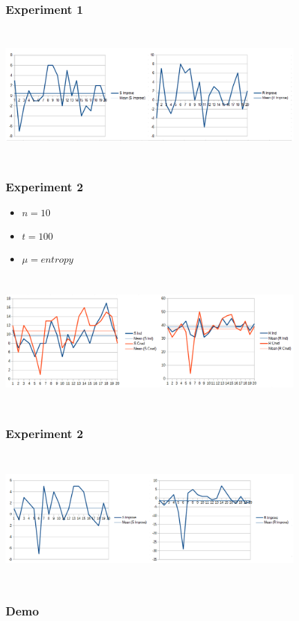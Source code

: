 \documentclass{beamer}
\begin{document}
	\begin{frame}
		\frametitle{Experiment 1}
		\includegraphics[width=11cm, height=5cm]{e1_improvement}
	\end{frame}

	\begin{frame}
		\frametitle{Experiment 2}
		\begin{itemize}
			\item $n = 10$
			\item $t = 100$
			\item $\mu = entropy$
		\end{itemize}
		\includegraphics[width=11cm, height=5cm]{e2_comparative}
	\end{frame}

	\begin{frame}
		\frametitle{Experiment 2}
		\includegraphics[width=11cm, height=5cm]{e2_improvement}
	\end{frame}

	\begin{frame}
		\frametitle{Demo}
	\end{frame}
\end{document}
